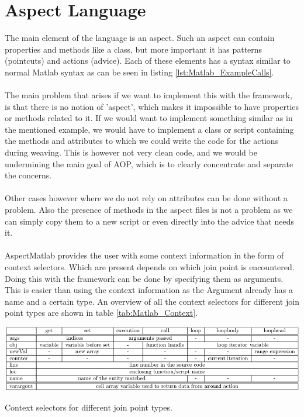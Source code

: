 \documentclass[a4paper]{report}
\begin{document}
\section{Aspect Language}
The main element of the language is an aspect. Such an aspect can contain properties and methods like a class, but more important it has patterns (pointcuts) and actions (advice). Each of these elements has a syntax similar to normal Matlab syntax as can be seen in listing \ref{lst:Matlab_ExampleCalls}.\\
\\
The main problem that arises if we want to implement this with the framework, is that there is no notion of 'aspect', which makes it impossible to have properties or methods related to it. If we would want to implement something similar as in the mentioned example, we would have to implement a class or script containing the methods and attributes to which we could write the code for the actions during weaving. This is however not very clean code, and we would be undermining the main goal of AOP, which is to clearly concentrate and separate the concerns.\\
\\
Other cases however where we do not rely on attributes can be done without a problem. Also the presence of methods in the aspect files is not a problem as we can simply copy them to a new script or even directly into the advice that needs it.\\
\\
AspectMatlab provides the user with some context information in the form of context selectors. Which are present depends on which join point is encountered. Doing this with the framework can be done by specifying them as arguments. This is easier than using the context information as the Argument already has a name and a certain type. An overview of all the context selectors for different join point types are shown in table \ref{tab:Matlab_Context}.
\begin{table}[h!]
\includegraphics[width=\textwidth]{images/Languages/Matlab_Context.png}
\caption{Context selectors for different join point types.\citep{aslam_aspectmatlab:_2010}}
\label{tab:Matlab_Context}
\end{table}
\end{document}
